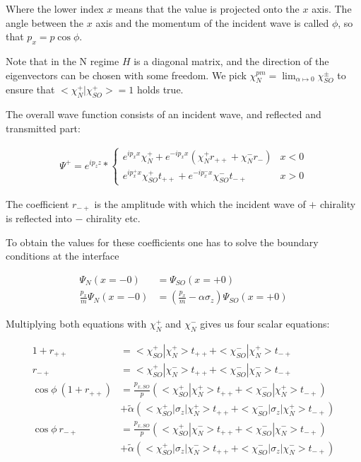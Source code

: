 \documentclass[11pt]{article}
\newcommand{\ta}{\tilde \alpha}
\begin{document}
Where the lower index $x$ means that the value is projected onto the
$x$ axis. The angle between the $x$ axis and the momentum of the
incident wave is called $\phi$, so that $p_x = p \cos \phi$.

Note that in the N regime $H$ is a diagonal matrix, and the direction
of the eigenvectors can be chosen with some freedom. We pick
$\chi_N^{pm} = \lim_{\alpha \mapsto 0} \chi_{SO}^{\pm}$ to ensure that
$<\chi_N^+|\chi_{SO}^+> = 1$ holds true.


The overall wave function consists of an incident wave, and reflected
and transmitted part:

\begin{align}
    \Psi^+ = e^{i p_z z} * \left\{
        \begin{array}{ll}
            e^{i p_x x} \chi_N^+ + e^{- i p_x x} (\chi_N^+ r_{++} +
                    \chi_N^- r_{-})     & x < 0\\
            e^{i p_x^+ x} \chi_{SO}^+ t_{++} + e^{-i p_x^- x}
            \chi_{SO}^- t_{-+}          & x > 0
        \end{array} \right.
\end{align}

The coefficient $r_{-+}$ is the amplitude with which the incident wave
of $+$ chirality is reflected into $-$ chirality etc.

To obtain the values for these coefficients one has to solve the
boundary conditions at the interface

\begin{align}
    \Psi_N(x = -0)              &= \Psi_{SO}(x = +0)\\
    \frac{p_x}{m} \Psi_N(x = -0)&= \left(\frac{p_x}{m} -\alpha \sigma_z\right)
                                        \Psi_{SO}(x = +0)
\end{align}

Multiplying both equations with $\chi_N^+$ and $\chi_N^-$ gives us
four scalar equations:

\begin{align}
    1 + r_{++}  &= <\chi_{SO}^+|\chi_N^+> t_{++} + <\chi_{SO}^-|\chi_N^+> t_{-+}\\
        r_{-+}  &= <\chi_{SO}^+|\chi_N^-> t_{++} + <\chi_{SO}^-|\chi_N^-> t_{-+}\\
    \cos \phi \  (1 + r_{++})
                &= \frac{p_{x,SO}}{p} \left(<\chi_{SO}^+|\chi_N^+> t_{++} 
                        + <\chi_{SO}^-|\chi_N^+> t_{-+} \right) \nonumber \\
                &  + \ta \left(<\chi_{SO}^+|\sigma_z|\chi_N^+> t_{++} 
                        + <\chi_{SO}^-|\sigma_z|\chi_N^+> t_{-+} \right) \\
    \cos \phi \  r_{-+}
                &= \frac{p_{x,SO}}{p} \left(<\chi_{SO}^+|\chi_N^-> t_{++} 
                        + <\chi_{SO}^-|\chi_N^-> t_{-+} \right) \nonumber \\
                &  + \ta \left(<\chi_{SO}^+|\sigma_z|\chi_N^-> t_{++} 
                        + <\chi_{SO}^-|\sigma_z|\chi_N^-> t_{-+} \right)
\end{align}
\end{document}
